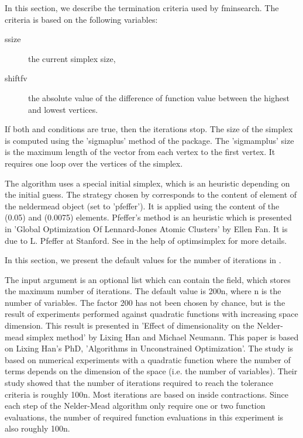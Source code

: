 %
\begin{Details}\relax
{}

In this section, we describe the termination criteria used by fminsearch.
The criteria is based on the following variables: \begin{description}

\item[ssize] the current simplex size,
\item[shiftfv] the absolute value of the difference of function value
between the highest and lowest vertices.

\end{description}


If both  and 
conditions are true, then the iterations stop. The size of the simplex is
computed using the 'sigmaplus' method of the  package. The
'sigmamplus' size is the maximum length of the vector from each vertex to the
first vertex. It requires one loop over the vertices of the simplex.


The  algorithm uses a special initial simplex, which is an
heuristic depending on the initial guess. The strategy chosen by
 corresponds to the content of 
element of the neldermead object (set to 'pfeffer').  It is applied using 
the content of the  (0.05) and
 (0.0075) elements. Pfeffer's method is an heuristic
which is presented in 'Global Optimization Of Lennard-Jones Atomic Clusters'
by Ellen Fan. It is due to L. Pfeffer at Stanford. See in the help of
optimsimplex for more details.


In this section, we present the default values for the number of iterations in
.

The  input argument is an optional list which can
contain the  field, which stores the maximum number of
iterations. The default value is 200n, where n is the number of variables.
The factor 200 has not been chosen by chance, but is the result of experiments
performed against quadratic functions with increasing space dimension.
This result is presented in 'Effect of dimensionality on the Nelder-mead
simplex method' by Lixing Han and Michael Neumann. This paper is based on
Lixing Han's  PhD, 'Algorithms in Unconstrained Optimization'. The study is
based on numerical experiments with a quadratic function where the number of
terms depends on the dimension of the space (i.e. the number of variables).
Their study showed that the number of iterations required to reach the
tolerance criteria is roughly 100n. Most iterations are based on inside
contractions. Since each step of the Nelder-Mead algorithm only require one
or two function evaluations, the number of required function evaluations in
this experiment is also roughly 100n.


\end{Details}
